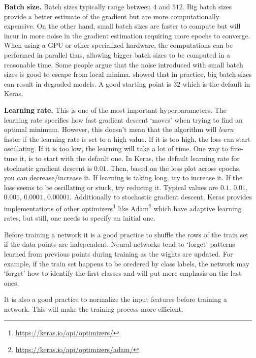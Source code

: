 \documentclass[
  11pt,
]{krantz}
\makeatletter
\newenvironment{kframe}{%
\medskip{}
\setlength{\fboxsep}{.8em}
 \def\at@end@of@kframe{}%
 \ifinner\ifhmode%
  \def\at@end@of@kframe{\end{minipage}}%
  \begin{minipage}{\columnwidth}%
 \fi\fi%
 \def\FrameCommand##1{\hskip\@totalleftmargin \hskip-\fboxsep
 \colorbox{shadecolor}{##1}\hskip-\fboxsep
     \hskip-\linewidth \hskip-\@totalleftmargin \hskip\columnwidth}%
 \MakeFramed {\advance\hsize-\width
   \@totalleftmargin\z@ \linewidth\hsize
   \@setminipage}}%
 {\par\unskip\endMakeFramed%
 \at@end@of@kframe}
\newenvironment{rmdblock}[1]
  {
  \begin{itemize}
  \renewcommand{\labelitemi}{
    \raisebox{-.7\height}[0pt][0pt]{
      {\setkeys{Gin}{width=3em,keepaspectratio}\texttt{[image: images/icons/\#1]}}
    }
  }
  \setlength{\fboxsep}{1em}
  \begin{kframe}
  \item
  }
  {
  \end{kframe}
  \end{itemize}
  }
\newenvironment{rmdgoodpractice}
  {\begin{rmdblock}{goodpractice}}
  {\end{rmdblock}}
\makeatother
\begin{document}
\textbf{Batch size.}
Batch sizes typically range between \(4\) and \(512\). Big batch sizes provide a better estimate of the gradient but are more computationally expensive. On the other hand, small batch sizes are faster to compute but will incur in more noise in the gradient estimation requiring more epochs to converge. When using a GPU or other specialized hardware, the computations can be performed in parallel thus, allowing bigger batch sizes to be computed in a reasonable time. Some people argue that the noise introduced with small batch sizes is good to escape from local minima. \citet{keskar2016} showed that in practice, big batch sizes can result in degraded models. A good starting point is \(32\) which is the default in Keras.

\textbf{Learning rate.}
This is one of the most important hyperparameters. The learning rate specifies how fast gradient descent `moves' when trying to find an optimal minimum. However, this doesn't mean that the algorithm will \emph{learn} faster if the learning rate is set to a high value. If it is too high, the loss can start oscillating. If it is too low, the learning will take a lot of time. One way to fine-tune it, is to start with the default one. In Keras, the default learning rate for stochastic gradient descent is \(0.01\). Then, based on the loss plot across epochs, you can decrease/increase it. If learning is taking long, try to increase it. If the loss seems to be oscillating or stuck, try reducing it. Typical values are \(0.1\), \(0.01\), \(0.001\), \(0.0001\), \(0.00001\). Additionally to stochastic gradient descent, Keras provides implementations of other optimizers\footnote{\url{https://keras.io/api/optimizers/}} like Adam\footnote{\url{https://keras.io/api/optimizers/adam/}} which have adaptive learning rates, but still, one needs to specify an initial one.

\begin{rmdgoodpractice}
Before training a network it is a good practice to shuffle the rows of the train set if the data points are independent. Neural networks tend to `forget' patterns learned from previous points during training as the wights are updated. For example, if the train set happens to be oredered by class labels, the network may `forget' how to identify the first classes and will put more emphasis on the last ones.
\end{rmdgoodpractice}

\begin{rmdgoodpractice}
It is also a good practice to normalize the input features before training a network. This will make the training process more efficient.
\end{rmdgoodpractice}
\end{document}

